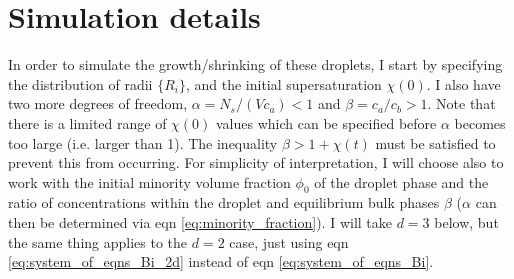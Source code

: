 \documentclass[12pt]{article}
\begin{document}
\section{Simulation details}
In order to simulate the growth/shrinking of these droplets, I start by specifying the distribution of radii $\{R_i\}$, and the initial supersaturation $\chi(0)$. I also have two more degrees of freedom, $\alpha=N_s/(Vc_a)<1$ and $\beta=c_a/c_b>1$. Note that there is a limited range of $\chi(0)$ values which can be specified before $\alpha$ becomes too large (i.e. larger than 1). The inequality $\beta>1+\chi(t)$ must be satisfied to prevent this from occurring. For simplicity of interpretation, I will choose also to work with the initial minority volume fraction $\phi_0$ of the droplet phase and the ratio of concentrations within the droplet and equilibrium bulk phases $\beta$ ($\alpha$ can then be determined via eqn \ref{eq:minority_fraction}). I will take $d=3$ below, but the same thing applies to the $d=2$ case, just using eqn \ref{eq:system_of_eqns_Bi_2d} instead of eqn \ref{eq:system_of_eqns_Bi}.
\end{document}
